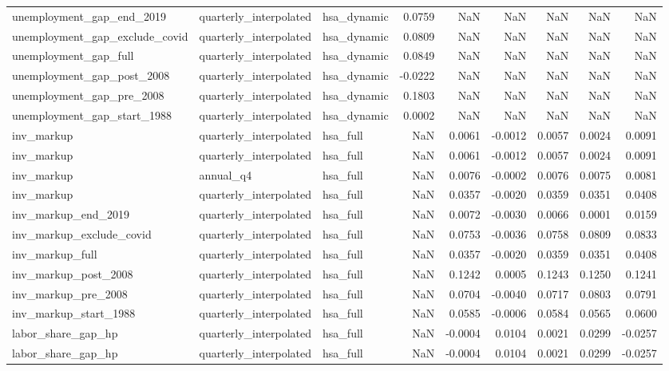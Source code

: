 \begin{tabular}{lllrrrrrr}
unemployment\_gap\_end\_2019 & quarterly\_interpolated & hsa\_dynamic & 0.0759 & NaN & NaN & NaN & NaN & NaN \\
unemployment\_gap\_exclude\_covid & quarterly\_interpolated & hsa\_dynamic & 0.0809 & NaN & NaN & NaN & NaN & NaN \\
unemployment\_gap\_full & quarterly\_interpolated & hsa\_dynamic & 0.0849 & NaN & NaN & NaN & NaN & NaN \\
unemployment\_gap\_post\_2008 & quarterly\_interpolated & hsa\_dynamic & -0.0222 & NaN & NaN & NaN & NaN & NaN \\
unemployment\_gap\_pre\_2008 & quarterly\_interpolated & hsa\_dynamic & 0.1803 & NaN & NaN & NaN & NaN & NaN \\
unemployment\_gap\_start\_1988 & quarterly\_interpolated & hsa\_dynamic & 0.0002 & NaN & NaN & NaN & NaN & NaN \\
inv\_markup & quarterly\_interpolated & hsa\_full & NaN & 0.0061 & -0.0012 & 0.0057 & 0.0024 & 0.0091 \\
inv\_markup & quarterly\_interpolated & hsa\_full & NaN & 0.0061 & -0.0012 & 0.0057 & 0.0024 & 0.0091 \\
inv\_markup & annual\_q4 & hsa\_full & NaN & 0.0076 & -0.0002 & 0.0076 & 0.0075 & 0.0081 \\
inv\_markup & quarterly\_interpolated & hsa\_full & NaN & 0.0357 & -0.0020 & 0.0359 & 0.0351 & 0.0408 \\
inv\_markup\_end\_2019 & quarterly\_interpolated & hsa\_full & NaN & 0.0072 & -0.0030 & 0.0066 & 0.0001 & 0.0159 \\
inv\_markup\_exclude\_covid & quarterly\_interpolated & hsa\_full & NaN & 0.0753 & -0.0036 & 0.0758 & 0.0809 & 0.0833 \\
inv\_markup\_full & quarterly\_interpolated & hsa\_full & NaN & 0.0357 & -0.0020 & 0.0359 & 0.0351 & 0.0408 \\
inv\_markup\_post\_2008 & quarterly\_interpolated & hsa\_full & NaN & 0.1242 & 0.0005 & 0.1243 & 0.1250 & 0.1241 \\
inv\_markup\_pre\_2008 & quarterly\_interpolated & hsa\_full & NaN & 0.0704 & -0.0040 & 0.0717 & 0.0803 & 0.0791 \\
inv\_markup\_start\_1988 & quarterly\_interpolated & hsa\_full & NaN & 0.0585 & -0.0006 & 0.0584 & 0.0565 & 0.0600 \\
labor\_share\_gap\_hp & quarterly\_interpolated & hsa\_full & NaN & -0.0004 & 0.0104 & 0.0021 & 0.0299 & -0.0257 \\
labor\_share\_gap\_hp & quarterly\_interpolated & hsa\_full & NaN & -0.0004 & 0.0104 & 0.0021 & 0.0299 & -0.0257 \\

\end{tabular}
